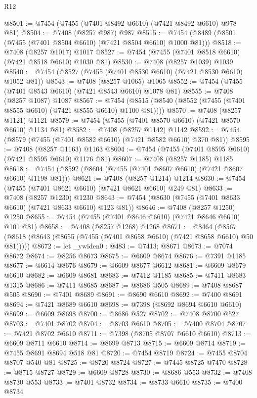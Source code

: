 \begin{lexlean}{R12}
\begin{coremodule}
@8501 := @7454 (@7455 (@7401 @8492 @6610) (@7421 @8492 @6610) @978 @81)
@8504 := @7408 (@8257 @987) @987
@8515 := @7454 (@8489 (@8501 (@7455 (@7401 @8504 @6610) (@7421 @8504 @6610) @1000 @81)))
@8518 := @7408 (@8257 @1017) @1017
@8527 := @7454 (@7455 (@7401 @8518 @6610) (@7421 @8518 @6610) @1030 @81)
@8530 := @7408 (@8257 @1039) @1039
@8540 := @7454 (@8527 (@7455 (@7401 @8530 @6610) (@7421 @8530 @6610) @1052 @81))
@8543 := @7408 (@8257 @1065) @1065
@8552 := @7454 (@7455 (@7401 @8543 @6610) (@7421 @8543 @6610) @1078 @81)
@8555 := @7408 (@8257 @1087) @1087
@8567 := @7454 (@8515 (@8540 (@8552 (@7455 (@7401 @8555 @6610) (@7421 @8555 @6610) @1100 @81))))
@8570 := @7408 (@8257 @1121) @1121
@8579 := @7454 (@7455 (@7401 @8570 @6610) (@7421 @8570 @6610) @1134 @81)
@8582 := @7408 (@8257 @1142) @1142
@8592 := @7454 (@8579 (@7455 (@7401 @8582 @6610) (@7421 @8582 @6610) @370 @81))
@8595 := @7408 (@8257 @1163) @1163
@8604 := @7454 (@7455 (@7401 @8595 @6610) (@7421 @8595 @6610) @1176 @81)
@8607 := @7408 (@8257 @1185) @1185
@8618 := @7454 (@8592 (@8604 (@7455 (@7401 @8607 @6610) (@7421 @8607 @6610) @1198 @81)))
@8621 := @7408 (@8257 @1214) @1214
@8630 := @7454 (@7455 (@7401 @8621 @6610) (@7421 @8621 @6610) @249 @81)
@8633 := @7408 (@8257 @1230) @1230
@8643 := @7454 (@8630 (@7455 (@7401 @8633 @6610) (@7421 @8633 @6610) @123 @81))
@8646 := @7408 (@8257 @1250) @1250
@8655 := @7454 (@7455 (@7401 @8646 @6610) (@7421 @8646 @6610) @101 @81)
@8658 := @7408 (@8257 @1268) @1268
@8671 := @8464
    (@8567 (@8618 (@8643 (@8655 (@7455 (@7401 @8658 @6610) (@7421 @8658 @6610) @50 @81)))))
@8672 := let _ywiden0 : @483 := @7413; @8671
@8673 := @7074 @8672
@8674 := @8256 @8673
@8675 := @6609 @8674
@8676 := @7391 @1185
@8677 := @6614 @8676
@8679 := @6609 @8677 @6612
@8681 := @6609 @8679 @6610
@8682 := @6609 @8681
@8683 := @7412 @1185
@8685 := @7411 @8683 @1315
@8686 := @7411 @8685
@8687 := @8686 @505
@8689 := @7408 @8687 @505
@8690 := @7401 @8689
@8691 := @8690 @6610
@8692 := @7400 @8691
@8694 := @7421 @8689 @6610
@8698 := @7398 (@8692 @8694 @6610 @6610)
@8699 := @6609 @8698
@8700 := @8686 @527
@8702 := @7408 @8700 @527
@8703 := @7401 @8702
@8704 := @8703 @6610
@8705 := @7400 @8704
@8707 := @7421 @8702 @6610
@8711 := @7398 (@8705 @8707 @6610 @6610)
@8713 := @6609 @8711 @6610
@8714 := @8699 @8713
@8715 := @6609 @8714
@8719 := @7455 @8691 @8694 @518 @81
@8720 := @7454 @8719
@8724 := @7455 @8704 @8707 @540 @81
@8725 := @8720 @8724
@8727 := @7445 @8725 @7470
@8728 := @8715 @8727
@8729 := @6609 @8728
@8730 := @8686 @553
@8732 := @7408 @8730 @553
@8733 := @7401 @8732
@8734 := @8733 @6610
@8735 := @7400 @8734

\end{coremodule}
\end{lexlean}
